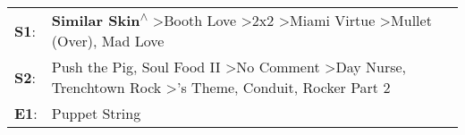 \begin{supertabular}{p{0.03\textwidth}p{0.92\textwidth}}
 \textbf{S1}:  &                                                             \textbf{Similar Skin\textsuperscript{$\wedge$}} \textgreater \enspace Booth Love\textsuperscript{} \textgreater \enspace 2x2\textsuperscript{} \textgreater \enspace Miami Virtue\textsuperscript{} \textgreater \enspace Mullet (Over)\textsuperscript{}, \enspace Mad Love\textsuperscript{}  \enspace  \\
 \textbf{S2}:  &  Push the Pig\textsuperscript{}, \enspace Soul Food II\textsuperscript{} \textgreater \enspace No Comment\textsuperscript{} \textgreater \enspace Day Nurse\textsuperscript{}, \enspace Trenchtown Rock\textsuperscript{} \textgreater {}'s Theme\textsuperscript{}, \enspace Conduit\textsuperscript{}, \enspace Rocker Part 2\textsuperscript{}  \enspace  \\
 \textbf{E1}:  &                                                                                                                                                                                                                                                                                                                            Puppet String\textsuperscript{}  \enspace  \\
\end{supertabular}
